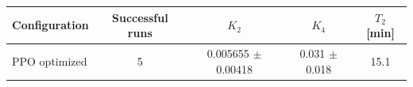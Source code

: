 \begin{tabular}{lcccc}
\toprule
Configuration & Successful runs & $K_2$ & $K_4$ & $T_2$ [min] \\
\midrule
PPO optimized & 5 & 0.005655 $\pm$ 0.00418 & 0.031 $\pm$ 0.018 & 15.1 \\
\bottomrule
\end{tabular}
